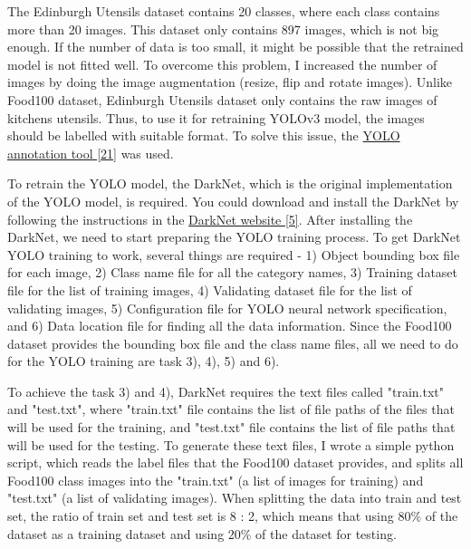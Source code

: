 \documentclass{article}
\begin{document}
The Edinburgh Utensils dataset contains 20 classes, where each class contains more than 20 images. This dataset only contains 897 images, which is not big enough. If the number of data is too small, it might be possible that the retrained model is not fitted well. To overcome this problem, I increased the number of images by doing the image augmentation (resize, flip and rotate images). Unlike Food100 dataset, Edinburgh Utensils dataset only contains the raw images of kitchens utensils. Thus, to use it for retraining YOLOv3 model, the images should be labelled with suitable format. To solve this issue, the \hyperlink{ref21}{YOLO annotation tool [21]} was used.

To retrain the YOLO model, the DarkNet, which is the original implementation of the YOLO model, is required. You could download and install the DarkNet by following the instructions in the \hyperlink{ref5}{DarkNet website [5]}. After installing the DarkNet, we need to start preparing the YOLO training process. To get DarkNet YOLO training to work, several things are required - 1) Object bounding box file for each image, 2) Class name file for all the category names, 3) Training dataset file for the list of training images, 4) Validating dataset file for the list of validating images, 5) Configuration file for YOLO neural network specification, and 6) Data location file for finding all the data information. Since the Food100 dataset provides the bounding box file and the class name files, all we need to do for the YOLO training are task 3), 4), 5) and 6).

To achieve the task 3) and 4), DarkNet requires the text files called "train.txt" and "test.txt", where "train.txt" file contains the list of file paths of the files that will be used for the training, and "test.txt" file contains the list of file paths that will be used for the testing. To generate these text files, I wrote a simple python script, which reads the label files that the Food100 dataset provides, and splits all Food100 class images into the "train.txt" (a list of images for training) and "test.txt" (a list of validating images). When splitting the data into train and test set, the ratio of train set and test set is 8 : 2, which means that using 80\% of the dataset as a training dataset and using 20\% of the dataset for testing.
\end{document}
